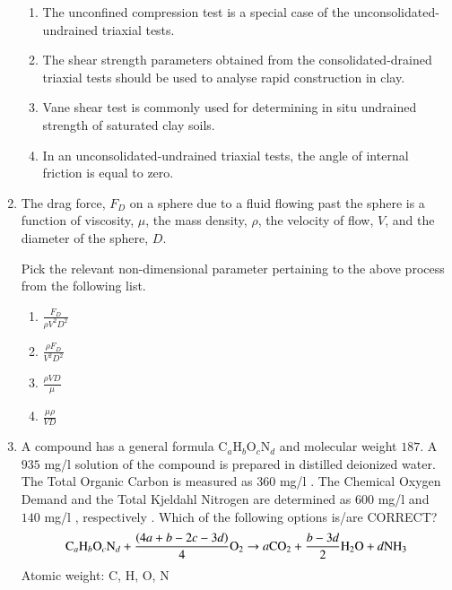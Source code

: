 \documentclass[journal,12pt,onecolumn]{article}
\theoremstyle{remark}
\begin{document}
\begin{enumerate}
    \hfill{}
    \begin{enumerate}
        \item The unconfined compression test is a special case of the unconsolidated-undrained  triaxial tests.
        \item The shear strength parameters obtained from the consolidated-drained  triaxial tests should be used to analyse rapid construction in clay.
        \item Vane shear test is commonly used for determining in situ undrained strength of saturated clay soils.
        \item In an unconsolidated-undrained  triaxial tests, the angle of internal friction \brak{\phi} is equal to zero.
    \end{enumerate}

    \item The drag force, $F_D$ on a sphere due to a fluid flowing past the sphere is a function of viscosity, $\mu$, the mass density, $\rho$, the velocity of flow, $V$, and the diameter of the sphere, $D$.
    
    Pick the relevant  non-dimensional parameter pertaining to the above process from the following list.
    
    \hfill{}
    \begin{enumerate}
        \item $\frac{F_D}{\rho V^2 D^2}$
        \item $\frac{\rho F_D}{V^2 D^2}$
        \item $\frac{\rho V D}{\mu}$
        \item $\frac{\mu \rho}{V D}$
    \end{enumerate}

    \item A compound has a general formula C$_a$H$_b$O$_c$N$_d$ and molecular weight $187$. A $935$ mg/l solution of the compound is prepared in distilled deionized water. The Total Organic Carbon  is measured as $360$ mg/l . The Chemical Oxygen Demand  and the Total Kjeldahl Nitrogen  are determined as $600$ mg/l  and $140$ mg/l , respectively . Which of the following options is/are CORRECT?
    \[ \text{C}_a\text{H}_b\text{O}_c\text{N}_d + \frac{\left(4a+b-2c-3d\right)}{4}\text{O}_2 \rightarrow a\text{CO}_2 + \frac{b-3d}{2}\text{H}_2\text{O} + d\text{NH}_3 \]
    Atomic weight: C, H, O, N
    

\end{enumerate}
\end{document}
